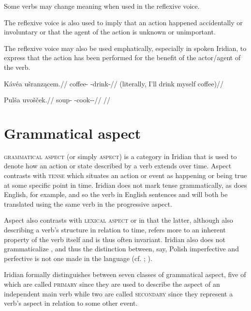 Some verbs may change meaning when used in the reflexive voice.


The reflexive voice is also used to imply that an action happened accidentally
or involuntary or that the agent of the action is unknown or unimportant.

The reflexive voice may also be used emphatically, especially in spoken Iridian,
to express that the action has been performed for the benefit of the actor/agent
of the verb.

\pex
\begingl
\gla Kávéa ušranzącem.//
\glb coffee-\Acc{} \Refl{}-drink-//
\glft {} (literally, I'll drink myself coffee)//
\endgl
\xe

\pex
\begingl
\gla Pulša uvošček.//
\glb soup-\Acc{} \Refl{}-cook-\Av{}-\Pf{}//
\glft {}//
\endgl
\xe

\section{Grammatical aspect}\label{sec:aspect}

{\scshape grammatical aspect} (or simply {\scshape aspect}) is a category in
Iridian that is used to denote how an action or state described by a verb
extends over time. Aspect contrasts with {\scshape tense} which situates an
action or event as happening or being true at some specific point in time.
Iridian does not mark tense grammatically, as does English, for
example, and so the verb in English sentences  and  will both be
translated using the same verb in the progressive aspect. 

Aspect also contrasts with {\scshape lexical aspect} or
 in that the latter,
although also describing a verb's structure in relation to time, refers more to
an inherent property of the verb itself and is thus often invariant. Iridian
also does not grammaticalize , and thus the distinction
between, say, Polish imperfective   and
perfective   is not one made in the
language (cf. \cite[9--26]{richardson2007}; \cite{comrie1976}).

Iridian formally distinguishes between seven classes of grammatical aspect, five
of which are called {\scshape primary} since they are used to describe the
aspect of an independent main verb while two are called {\scshape secondary}
since they represent a verb's aspect in relation to some other event.

